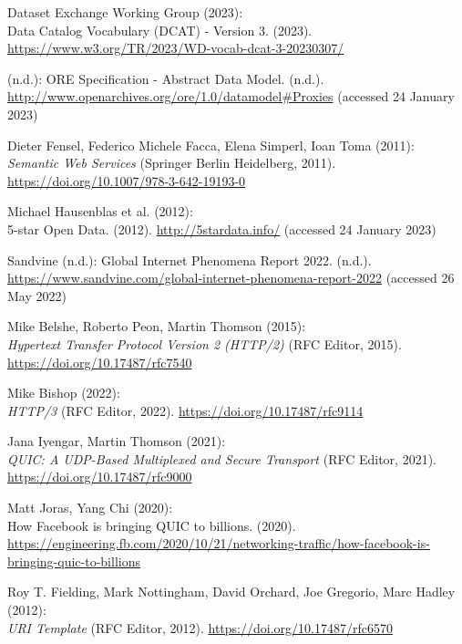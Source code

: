 \begin{thebibliography}{9}
Dataset Exchange Working Group (2023): \\
{Data Catalog Vocabulary ({DCAT})
- Version 3}. (2023).
\url{https://www.w3.org/TR/2023/WD-vocab-dcat-3-20230307/}

(n.d.): {ORE Specification} - {Abstract Data Model}. (n.d.).
\url{http://www.openarchives.org/ore/1.0/datamodel\#Proxies} (accessed
24 January 2023)

Dieter Fensel, Federico Michele Facca, Elena Simperl, Ioan Toma
(2011): \\
\emph{Semantic {Web Services}} ({Springer Berlin Heidelberg},
2011).
\url{https://doi.org/10.1007/978-3-642-19193-0}

Michael Hausenblas et al. (2012): \\
5-star {Open Data}. (2012).
\url{http://5stardata.info/} (accessed 24 January 2023)

Sandvine (n.d.): Global {Internet Phenomena Report} 2022. (n.d.).
\url{https://www.sandvine.com/global-internet-phenomena-report-2022}
(accessed 26 May 2022)

Mike Belshe, Roberto Peon, Martin Thomson (2015): \\
\emph{Hypertext
{Transfer Protocol Version} 2 ({HTTP}/2)} ({RFC Editor}, 2015).
\url{https://doi.org/10.17487/rfc7540}

Mike Bishop (2022): \\
\emph{{HTTP}/3} ({RFC} Editor, 2022).
\url{https://doi.org/10.17487/rfc9114}

Jana Iyengar, Martin Thomson (2021): \\
\emph{{QUIC}: {A UDP-Based
Multiplexed} and {Secure Transport}} ({RFC Editor}, 2021).
\url{https://doi.org/10.17487/rfc9000}

Matt Joras, Yang Chi (2020): \\
How {Facebook} is bringing {QUIC} to
billions. (2020).
\url{https://engineering.fb.com/2020/10/21/networking-traffic/how-facebook-is-bringing-quic-to-billions}

Roy T. Fielding, Mark Nottingham, David Orchard, Joe Gregorio, Marc
Hadley (2012): \\
\emph{{URI Template}} ({RFC Editor}, 2012).
\url{https://doi.org/10.17487/rfc6570}


\end{thebibliography}
